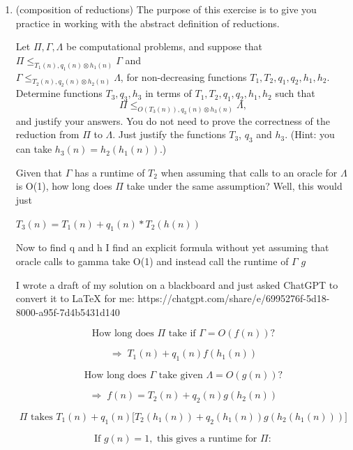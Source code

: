 \documentclass[11pt]{report}
\begin{document}
\begin{enumerate}
\begin{enumerate}
\end{enumerate}
    
    Similar techniques to what you are using in this problem are used in algorithms for other important geometric problems, like finding the Convex Hull of a set of points, which has applications in graphics and machine learning.




    \item (composition of reductions) 
 The purpose of this exercise is to give you practice in working with the abstract definition of reductions. 
    
    Let $\Pi, \Gamma, \Lambda$ be computational problems, and suppose that $\Pi\leq_{T_1(n),q_1(n)\otimes h_1(n)} \Gamma$ and \\ $\Gamma \leq_{T_2(n),q_2(n)\otimes h_2(n)} \Lambda$, for non-decreasing functions $T_1,T_2,q_1,q_2,h_1,h_2$.  Determine functions $T_3,q_3,h_3$ in terms of $T_1,T_2,q_1,q_2,h_1,h_2$ such that 
    $$\Pi \leq_{O(T_3(n)),q_3(n)\otimes h_3(n)} \Lambda,$$
    and justify your answers. You do not need to prove the correctness of the reduction from $\Pi$ to $\Lambda$. Just justify the functions $T_3$, $q_3$ and $h_3$. (Hint: you can take $h_3(n)=h_2(h_1(n))$.)

    Given that $\Gamma$ has a runtime of $T_2$ when assuming that calls to an oracle for $\Lambda$ is O(1),
    how long does $\Pi$ take under the same assumption?
    Well, this would just

    $T_3(n) = T_1(n) + q_1(n)*T_2(h(n))$

    Now to find q and h I find an explicit formula without yet assuming that oracle calls to gamma take O(1) and instead call the runtime of $\Gamma$ $g$

    I wrote a draft of my solution on a blackboard and just asked ChatGPT to convert it to LaTeX for me: https://chatgpt.com/share/e/6995276f-5d18-8000-a95f-7d4b5431d140

\[
\text{How long does } \Pi \text{ take if } \Gamma = O(f(n))?
\]

\[
\Rightarrow \; T_1(n) + q_1(n) f(h_1(n))
\]

\[
\text{How long does } \Gamma \text{ take given } \Lambda = O(g(n))?
\]

\[
\Rightarrow \; f(n) = T_2(n) + q_2(n) g(h_2(n))
\]

\[
\Pi \text{ takes }
T_1(n) + q_1(n)\Big[ T_2(h_1(n)) + q_2(h_1(n)) g(h_2(h_1(n))) \Big]
\]

\[
\text{If } g(n)=1,\text{ this gives a runtime for }  \Pi :
\]


\end{enumerate}
\end{document}
